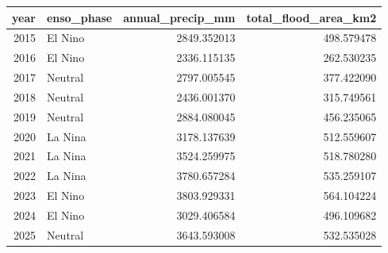 \begin{tabular}{rlrr}
\toprule
year & enso\_phase & annual\_precip\_mm & total\_flood\_area\_km2 \\
\midrule
2015 & El Nino & 2849.352013 & 498.579478 \\
2016 & El Nino & 2336.115135 & 262.530235 \\
2017 & Neutral & 2797.005545 & 377.422090 \\
2018 & Neutral & 2436.001370 & 315.749561 \\
2019 & Neutral & 2884.080045 & 456.235065 \\
2020 & La Nina & 3178.137639 & 512.559607 \\
2021 & La Nina & 3524.259975 & 518.780280 \\
2022 & La Nina & 3780.657284 & 535.259107 \\
2023 & El Nino & 3803.929331 & 564.104224 \\
2024 & El Nino & 3029.406584 & 496.109682 \\
2025 & Neutral & 3643.593008 & 532.535028 \\
\bottomrule
\end{tabular}
